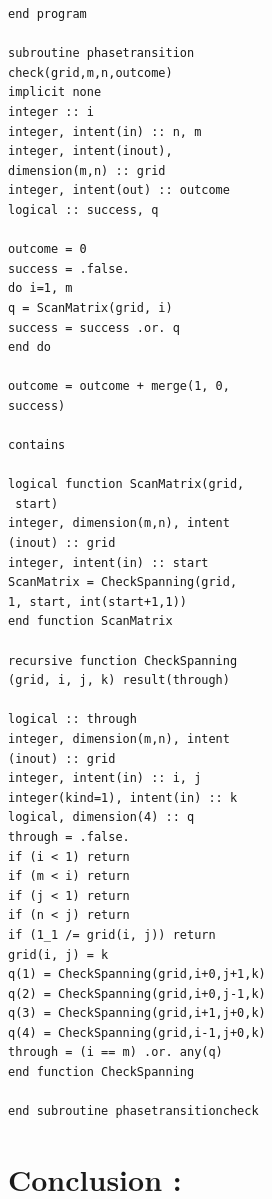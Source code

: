 \documentclass[twocolumn]{article}
\begin{document}
\begin{verbatim}
end program

subroutine phasetransition
check(grid,m,n,outcome)
implicit none
integer :: i
integer, intent(in) :: n, m
integer, intent(inout), 
dimension(m,n) :: grid
integer, intent(out) :: outcome 
logical :: success, q

outcome = 0
success = .false.
do i=1, m
q = ScanMatrix(grid, i)
success = success .or. q
end do

outcome = outcome + merge(1, 0, 
success)

contains

logical function ScanMatrix(grid,
 start)
integer, dimension(m,n), intent
(inout) :: grid
integer, intent(in) :: start
ScanMatrix = CheckSpanning(grid, 
1, start, int(start+1,1))
end function ScanMatrix

recursive function CheckSpanning
(grid, i, j, k) result(through)

logical :: through
integer, dimension(m,n), intent
(inout) :: grid
integer, intent(in) :: i, j
integer(kind=1), intent(in) :: k
logical, dimension(4) :: q
through = .false.
if (i < 1) return
if (m < i) return
if (j < 1) return
if (n < j) return
if (1_1 /= grid(i, j)) return
grid(i, j) = k
q(1) = CheckSpanning(grid,i+0,j+1,k)
q(2) = CheckSpanning(grid,i+0,j-1,k)
q(3) = CheckSpanning(grid,i+1,j+0,k)
q(4) = CheckSpanning(grid,i-1,j+0,k)
through = (i == m) .or. any(q)
end function CheckSpanning

end subroutine phasetransitioncheck
\end{verbatim}
\section{Conclusion :}
\paragraph*{}

\end{document}
